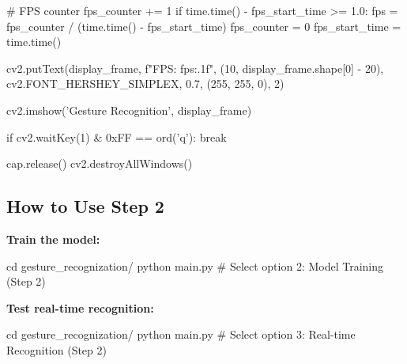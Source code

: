\begin{aivncodebox}
\begin{python}
            # FPS counter
            fps_counter += 1
            if time.time() - fps_start_time >= 1.0:
                fps = fps_counter / (time.time() - fps_start_time)
                fps_counter = 0
                fps_start_time = time.time()
            
            cv2.putText(display_frame, f"FPS: {fps:.1f}", (10, display_frame.shape[0] - 20),
                       cv2.FONT_HERSHEY_SIMPLEX, 0.7, (255, 255, 0), 2)
            
            cv2.imshow('Gesture Recognition', display_frame)
            
            if cv2.waitKey(1) & 0xFF == ord('q'):
                break
        
        cap.release()
        cv2.destroyAllWindows()
\end{python}
\end{aivncodebox}

\subsection{How to Use Step 2}

\textbf{Train the model:}
\begin{aivncodebox}
\begin{python}
cd gesture_recognization/
python main.py  # Select option 2: Model Training (Step 2)
\end{python}
\end{aivncodebox}

\textbf{Test real-time recognition:}
\begin{aivncodebox}
\begin{python}
cd gesture_recognization/
python main.py  # Select option 3: Real-time Recognition (Step 2)
\end{python}
\end{aivncodebox}
